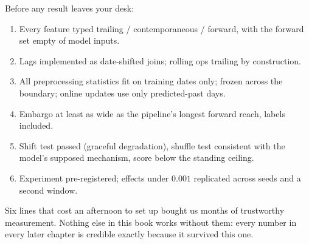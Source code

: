 Before any result leaves your desk:

\begin{enumerate}
\item Every feature typed trailing / contemporaneous / forward, with the
  forward set empty of model inputs.
\item Lags implemented as date-shifted joins; rolling ops trailing by
  construction.
\item All preprocessing statistics fit on training dates only; frozen
  across the boundary; online updates use only predicted-past days.
\item Embargo at least as wide as the pipeline's longest forward reach,
  labels included.
\item Shift test passed (graceful degradation), shuffle test consistent
  with the model's supposed mechanism, score below the standing ceiling.
\item Experiment pre-registered; effects under $0.001$ replicated across
  seeds and a second window.
\end{enumerate}

Six lines that cost an afternoon to set up bought us months of trustworthy
measurement. Nothing else in this book works without them: every number in
every later chapter is credible exactly because it survived this one.
